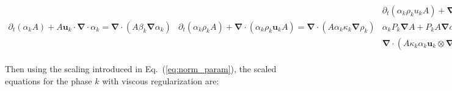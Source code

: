 \documentclass[preprint,10pt]{elsarticle}
\renewcommand{\div}{\mbold{\nabla}\! \cdot \!}
\newcommand{\grad}{\mbold{\nabla}}
\newcommand{\mbold}[1]{\boldsymbol#1}
\newcommand{\eqt}[1]{Eq.~(\ref{#1})}                     %
\begin{document}
\begin{subequations}\label{eq:sev_equ_case_one}
\begin{align}\label{eq:sev_equ-with-diss-terms-vf_one}
\partial_t \left( \alpha_k  A\right) + A \mbold u_k \cdot \div \alpha_k =  \div \left( A \beta_k \grad \alpha_k \right)
\end{align}
\begin{align}\label{eq:sev_equ-with-diss-terms-cont_one}
\partial_t \left( \alpha_k \rho_k A \right) + \div \left( \alpha_k \rho_k \mbold u_k A \right) = \div \left( A \alpha_k \kappa_k \grad \rho_k \right)
\end{align}
\begin{align}\label{eq:sev_equ-with-diss-terms-mom_one}
\partial_t \left( \alpha_k \rho_k u_k A \right) + \div \left[ \alpha_k A \left( \rho_k  \mbold u_k \otimes \mbold u_k + P_k \right) \right] &=\nonumber\\
\alpha_k P_k \grad A + P_k A \grad \alpha_k &+ \div \left(A \mu_k \alpha_k  \rho_k \grad^s \mbold u_k \right) + \nonumber \\
\div \left(A \kappa_k \alpha_k \mbold u_k \otimes \grad \rho_k \right) &+ \div \left( A \beta_k \rho_k \mbold u_k \otimes \grad \alpha_k \right)
\end{align}
\begin{align}\label{eq:sev_equ-with-diss-terms-ener_one}
\partial_t \left( \alpha_k \rho_k E_k A \right) + \div \left[ \alpha_k A \mbold u_k \left( \rho_k E_k + P_k \right) \right] &= \nonumber \\
P_k A \mbold u_k\cdot \grad \alpha_k &+ \div \left( A \kappa_k \alpha_k \grad \left( \rho_k e_k \right) \right) + \nonumber \\
\div \left( A \kappa_k \alpha_k \frac{||\mbold u_k||^2}{2} \grad \rho_k \right) &+ \div \left( A \mu_k \alpha_k \rho_k \mbold u_k : \grad^s \mbold u_k\right) +\nonumber \\
\div \left(A \beta_k \rho_k e_k \grad \alpha_k\right)&
\end{align}
\end{subequations}
%
Then using the scaling introduced in \eqt{eq:norm_param}, the scaled equations for the phase $k$ with viscous regularization are:
% 
\end{document}
